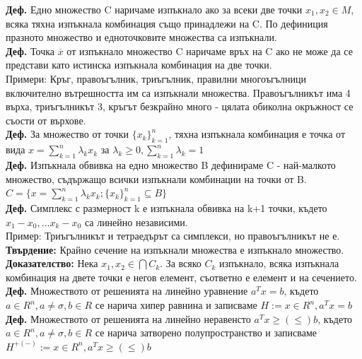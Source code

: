 \documentclass[12pt, a4paper]{article}
\begin{document}
\textbf{Деф.} Едно множество C наричаме изпъкнало ако за всеки две точки $x_1, x_2 \in M$, всяка тяхна изпъкнала комбинация също принадлежи на C. По дефиниция празното множество и едноточковите множества са изпъкнали.\\

\textbf{Деф.} Точка $\overline{x}$ от изпъкнало множество C наричаме връх на C ако не може да се представи като истинска изпъкнала комбинация на две точки.\\

Примери: Кръг, правоъгълник, триъгълник, правилни многоъгълници включително вътрешността им са изпъкнали множества. Правоъгълникът има 4 върха, триъгълникът 3, кръгът безкрайно много - цялата обиколна окръжност се съости от върхове.\\

\textbf{Деф.} За множество от точки $\{x_k\}_{k=1}^n$, тяхна изпъкнала комбинация е точка от вида $x=\sum_{k=1}^n\lambda_kx_k$ за $\lambda_k \geq 0, \sum_{k=1}^n\lambda_k=1$\\

\textbf{Деф.} Изпъкнала обвивка на едно множество B дефинираме C - най-малкото множество, съдържащо всички изпъкнали комбинации на точки от B. $C = \{x = \sum_{k=1}^n\lambda_kx_k; \{x_k\}_{k=1}^n\subseteq B\}$\\

\textbf{Деф.} Симплекс с размерност k е изпъкнала обвивка на k+1 точки, където $x_1-x_0, ... x_k-x_0$ са линейно независими.\\
Пример: Триъгълникът и тетраедърът са симплекси, но правоъгълникът не е.\\

\textbf{Твърдение:} Крайно сечение на изпъкнали множества е изпъкнало множество.\\
\textbf{Доказателство:} Нека $x_1, x_2 \in \bigcap C_k$. За всяко $C_k$ изпъкнало, всяка изпъкнала комбинация на двете точки е негов елемент, съответно е елемент и на сечението.\\

\textbf{Деф.} Множеството от решенията на линейно уравнение $a^Tx=b$, където $a\in R^n, a\ne\sigma, b\in R$ се нарича хипер равнина и записваме $H := {x\in R^n, a^Tx=b}$\\

\textbf{Деф.} Множеството от решенията на линейно неравенсто $a^Tx \geq(\leq) b$, където $a\in R^n, a\ne\sigma, b\in R$ се нарича затворено полупространство и записваме $H^{+(-)} := {x\in R^n, a^Tx\geq(\leq)b}$\\
\end{document}
